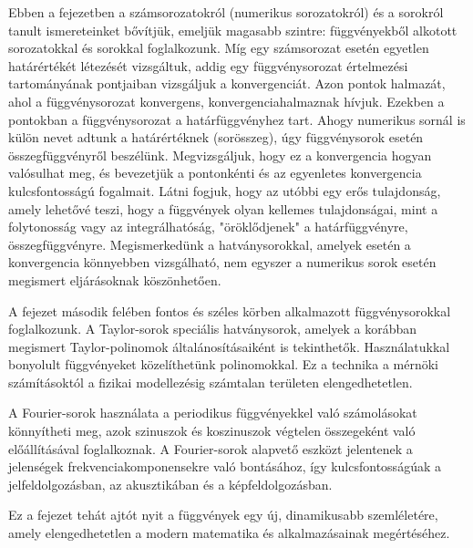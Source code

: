 \label{chap-02}

\bgroup
\color{gray!50!black}
\sffamily

Ebben a fejezetben a számsorozatokról (numerikus sorozatokról) és a sorokról
tanult ismereteinket bővítjük, emeljük magasabb szintre: függvényekből alkotott
sorozatokkal és sorokkal foglalkozunk. Míg egy számsorozat esetén egyetlen
határértékét létezését vizsgáltuk, addig egy függvénysorozat értelmezési
tartományának pontjaiban vizsgáljuk a konvergenciát. Azon pontok halmazát, ahol
a függvénysorozat konvergens, konvergenciahalmaznak hívjuk. Ezekben a pontokban
a függvénysorozat a határfüggvényhez tart. Ahogy numerikus sornál is külön nevet
adtunk a határértéknek (sorösszeg), úgy függvénysorok esetén összegfüggvényről
beszélünk. Megvizsgáljuk, hogy ez a konvergencia hogyan valósulhat meg, és
bevezetjük a pontonkénti és az egyenletes konvergencia kulcsfontosságú
fogalmait. Látni fogjuk, hogy az utóbbi egy erős tulajdonság, amely lehetővé
teszi, hogy a függvények olyan kellemes tulajdonságai, mint a folytonosság vagy
az integrálhatóság, "öröklődjenek" a határfüggvényre, összegfüggvényre.
Megismerkedünk a hatványsorokkal, amelyek esetén a konvergencia könnyebben
vizsgálható, nem egyszer a numerikus sorok esetén megismert eljárásoknak
köszönhetően.

A fejezet második felében fontos és széles körben alkalmazott függvénysorokkal
foglalkozunk. A Taylor-sorok speciális hatványsorok, amelyek a korábban
megismert Taylor-polinomok általánosításaiként is tekinthetők. Használatukkal
bonyolult függvényeket közelíthetünk polinomokkal. Ez a technika a mérnöki
számításoktól a fizikai modellezésig számtalan területen elengedhetetlen.

A Fourier-sorok használata a periodikus függvényekkel való számolásokat
könnyítheti meg, azok szinuszok és koszinuszok végtelen összegeként való
előállításával foglalkoznak. A Fourier-sorok alapvető eszközt jelentenek a
jelenségek frekvenciakomponensekre való bontásához, így kulcsfontosságúak a
jelfeldolgozásban, az akusztikában és a képfeldolgozásban.

Ez a fejezet tehát ajtót nyit a függvények egy új, dinamikusabb szemléletére,
amely elengedhetetlen a modern matematika és alkalmazásainak megértéséhez.

\chaptertoc
\egroup